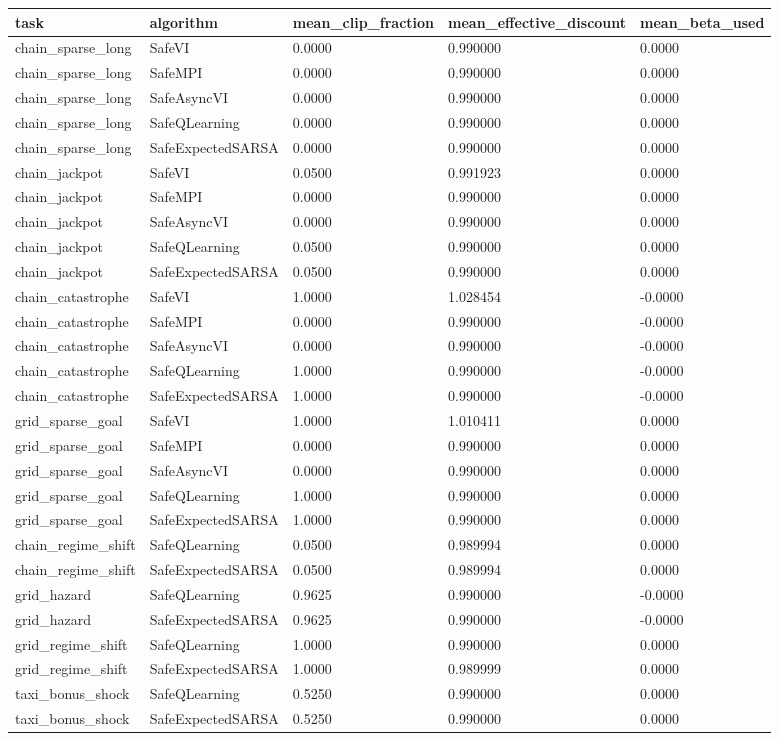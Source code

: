 \begin{tabular}{lllll}
\toprule
task & algorithm & mean_clip_fraction & mean_effective_discount & mean_beta_used \\
\midrule
chain_sparse_long & SafeVI & 0.0000 & 0.990000 & 0.0000 \\
chain_sparse_long & SafeMPI & 0.0000 & 0.990000 & 0.0000 \\
chain_sparse_long & SafeAsyncVI & 0.0000 & 0.990000 & 0.0000 \\
chain_sparse_long & SafeQLearning & 0.0000 & 0.990000 & 0.0000 \\
chain_sparse_long & SafeExpectedSARSA & 0.0000 & 0.990000 & 0.0000 \\
chain_jackpot & SafeVI & 0.0500 & 0.991923 & 0.0000 \\
chain_jackpot & SafeMPI & 0.0000 & 0.990000 & 0.0000 \\
chain_jackpot & SafeAsyncVI & 0.0000 & 0.990000 & 0.0000 \\
chain_jackpot & SafeQLearning & 0.0500 & 0.990000 & 0.0000 \\
chain_jackpot & SafeExpectedSARSA & 0.0500 & 0.990000 & 0.0000 \\
chain_catastrophe & SafeVI & 1.0000 & 1.028454 & -0.0000 \\
chain_catastrophe & SafeMPI & 0.0000 & 0.990000 & -0.0000 \\
chain_catastrophe & SafeAsyncVI & 0.0000 & 0.990000 & -0.0000 \\
chain_catastrophe & SafeQLearning & 1.0000 & 0.990000 & -0.0000 \\
chain_catastrophe & SafeExpectedSARSA & 1.0000 & 0.990000 & -0.0000 \\
grid_sparse_goal & SafeVI & 1.0000 & 1.010411 & 0.0000 \\
grid_sparse_goal & SafeMPI & 0.0000 & 0.990000 & 0.0000 \\
grid_sparse_goal & SafeAsyncVI & 0.0000 & 0.990000 & 0.0000 \\
grid_sparse_goal & SafeQLearning & 1.0000 & 0.990000 & 0.0000 \\
grid_sparse_goal & SafeExpectedSARSA & 1.0000 & 0.990000 & 0.0000 \\
chain_regime_shift & SafeQLearning & 0.0500 & 0.989994 & 0.0000 \\
chain_regime_shift & SafeExpectedSARSA & 0.0500 & 0.989994 & 0.0000 \\
grid_hazard & SafeQLearning & 0.9625 & 0.990000 & -0.0000 \\
grid_hazard & SafeExpectedSARSA & 0.9625 & 0.990000 & -0.0000 \\
grid_regime_shift & SafeQLearning & 1.0000 & 0.990000 & 0.0000 \\
grid_regime_shift & SafeExpectedSARSA & 1.0000 & 0.989999 & 0.0000 \\
taxi_bonus_shock & SafeQLearning & 0.5250 & 0.990000 & 0.0000 \\
taxi_bonus_shock & SafeExpectedSARSA & 0.5250 & 0.990000 & 0.0000 \\
\bottomrule
\end{tabular}
